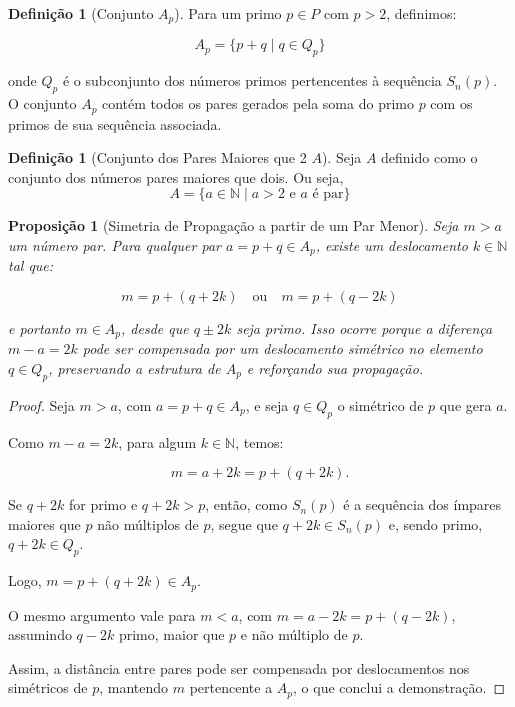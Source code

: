 \documentclass[a4paper,11pt]{article}
\newtheorem{proposition}[theorem]{Proposição}
\theoremstyle{definition}
\newtheorem{definition}[theorem]{Definição}
\theoremstyle{remark}
\begin{document}
\begin{otherlanguage}{brazil}
	
	\begin{definition}[Conjunto \(A_p\)]
		Para um primo \(p \in P\) com \(p > 2\), definimos:
		
		\[
		A_p = \{p + q \mid q \in Q_p\}
		\]
		
		onde \(Q_p\) é o subconjunto dos números primos pertencentes à sequência \(S_n(p)\). O conjunto \(A_p\) contém todos os pares gerados pela soma do primo \(p\) com os primos de sua sequência associada.
	\end{definition}
	
	\begin{definition}[Conjunto dos Pares Maiores que 2 \(A\)]
		Seja \(A\) definido como o conjunto dos números pares maiores que dois. Ou seja, 
		\[
		A = \{a \in \mathbb{N} \mid a > 2 \text{ e } a \text{ é par} \}
		\]
	\end{definition}
	
	\begin{proposition}[Simetria de Propagação a partir de um Par Menor]
		Seja \(m > a\) um número par. Para qualquer par \(a = p + q \in A_p\), existe um deslocamento \(k \in \mathbb{N}\) tal que:
		
		\[
		m = p + (q + 2k) \quad \text{ou} \quad m = p + (q - 2k)
		\]
		
		e portanto \(m \in A_p\), desde que \(q \pm 2k\) seja primo. Isso ocorre porque a diferença \(m - a = 2k\) pode ser compensada por um deslocamento simétrico no elemento \(q \in Q_p\), preservando a estrutura de \(A_p\) e reforçando sua propagação.
	\end{proposition}
	
	\begin{proof}
		Seja \(m > a\), com \(a = p + q \in A_p\), e seja \(q \in Q_p\) o simétrico de \(p\) que gera \(a\).
		
		Como \(m - a = 2k\), para algum \(k \in \mathbb{N}\), temos:
		
		\[
		m = a + 2k = p + (q + 2k).
		\]
		
		Se \(q + 2k\) for primo e \(q + 2k > p\), então, como \(S_n(p)\) é a sequência dos ímpares maiores que \(p\) não múltiplos de \(p\), segue que \(q + 2k \in S_n(p)\) e, sendo primo, \(q + 2k \in Q_p\).
		
		Logo, \(m = p + (q + 2k) \in A_p\).
		
		O mesmo argumento vale para \(m < a\), com \(m = a - 2k = p + (q - 2k)\), assumindo \(q - 2k\) primo, maior que \(p\) e não múltiplo de \(p\).
		
		Assim, a distância entre pares pode ser compensada por deslocamentos nos simétricos de \(p\), mantendo \(m\) pertencente a \(A_p\), o que conclui a demonstração.
	\end{proof}
	

\end{otherlanguage}
\end{document}
